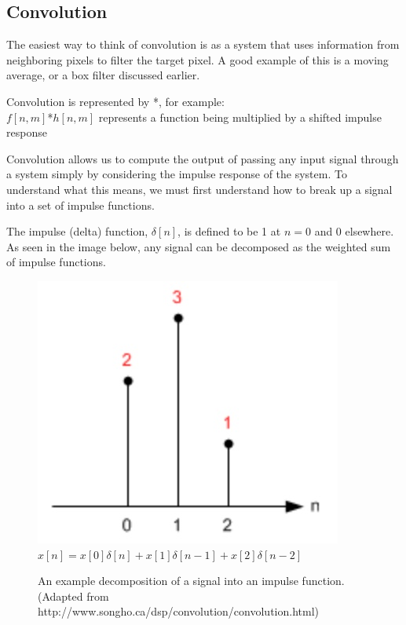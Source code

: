 \documentclass{article}
\begin{document}
\subsection{Convolution}

The easiest way to think of convolution is as a system that uses information from neighboring pixels to filter the target pixel. A good example of this is a moving average, or a box filter discussed earlier.

Convolution is represented by *, for example: \\
$f[n,m]$*$h[n,m]$
represents a function being multiplied by a shifted impulse response


Convolution allows us to compute the output of passing any input signal through a system simply by considering the impulse response of the system. To understand what this means, we must first understand how to break up a signal into a set of impulse functions.

The impulse (delta) function, $\delta [n]$, is defined to be 1 at $n = 0$ and 0 elsewhere. As seen in the image below, any signal can be decomposed as the weighted sum of impulse functions.



\begin{figure}[h!]
\begin{center}
\includegraphics[scale=0.4]{input_signal_.jpeg} \\
$x[n] = x[0]\delta [n] + x[1]\delta [n-1] + x[2]\delta [n-2]$ \\
\caption{An example decomposition of a signal into an impulse function. (Adapted from http://www.songho.ca/dsp/convolution/convolution.html)}
\end{center}
\end{figure}
\end{document}
